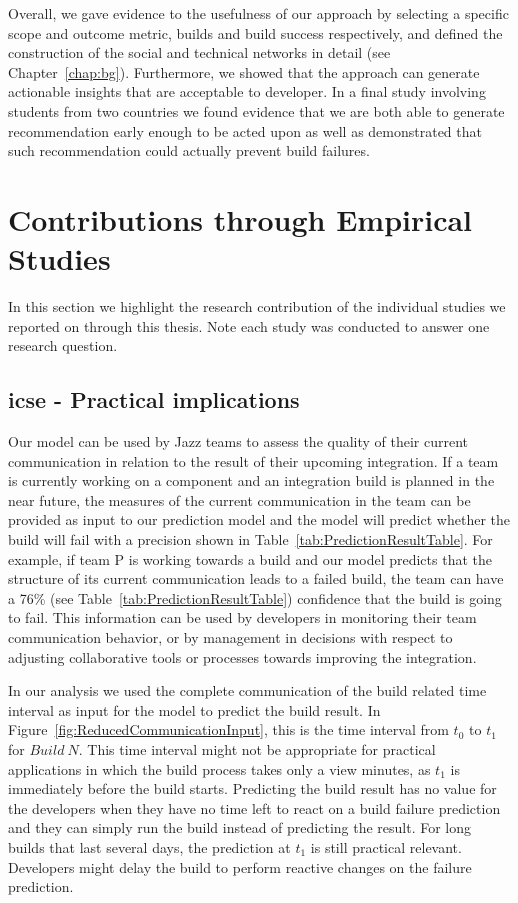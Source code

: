 Overall, we gave evidence to the usefulness of our approach by selecting a specific scope and outcome metric, builds and build success respectively, and defined the construction of the social and technical networks in detail (see Chapter~\ref{chap:bg}).
Furthermore, we showed that the approach can generate actionable insights that are acceptable to developer.
In a final study involving students from two countries we found evidence that we are both able to generate recommendation early enough to be acted upon as well as demonstrated that such recommendation could actually prevent build failures.



\section{Contributions through Empirical Studies}
In this section we highlight the research contribution of the individual studies we reported on through this thesis.
Note each study was conducted to answer one research question.

\subsection{icse - Practical implications}
\label{subsec:practicalimpl}
Our model can be used by Jazz teams to assess the quality of their current
communication in relation to the result of their upcoming integration. If a team
is currently working on a component and an integration build is planned in the
near future, the measures of the current communication in the team can be
provided as input to our prediction model and the model will predict whether the
build will fail with a precision shown in Table~\ref{tab:PredictionResultTable}.
For example, if team P is working towards a build and our model predicts that the
structure of its current communication leads to a failed build, the team can have
a 76\% (see Table~\ref{tab:PredictionResultTable}) confidence that the build is
going to fail. This information can be used by developers in monitoring their
team communication behavior, or by management in decisions with respect to
adjusting collaborative tools or processes towards improving the integration.

In our analysis we used the complete communication of the build related time
interval as input for the model to predict the build result. In
Figure~\ref{fig:ReducedCommunicationInput}, this is the time interval from $t_0$
to $t_1$ for $Build~N$. This time interval might not be appropriate for practical
applications in which the build process takes only a view minutes, as $t_1$ is
immediately before the build starts. Predicting the build result has no value for
the developers when they have no time left to react on a build failure prediction
and they can simply run the build instead of predicting the result. For long
builds that last several days, the prediction at $t_1$ is still practical
relevant. Developers might delay the build to perform reactive changes on the
failure prediction.

